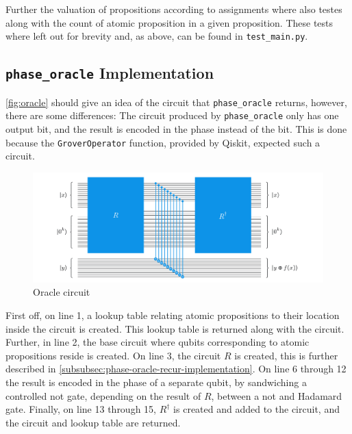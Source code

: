Further the valuation of propositions according to assignments where also testes along with the count of atomic proposition in a given proposition.
These tests where left out for brevity and, as above, can be found in \texttt{test\_main.py}.

\subsection{\texttt{phase\_oracle} Implementation}\label{subsec:phase-oracle}

\autoref{fig:oracle} should give an idea of the circuit that \texttt{phase\_oracle} returns, however, there are some differences: The circuit produced by \texttt{phase\_oracle} only has one output bit, and the result is encoded in the phase instead of the bit.
This is done because the \texttt{GroverOperator} function, provided by Qiskit, expected such a circuit.

\begin{figure}[H]
    \centering
    \includegraphics[width=\textwidth]{figures/garbage-free-computation.jpg}
    \caption{Oracle circuit}
    \label{fig:oracle}
\end{figure}

First off, on line 1, a lookup table relating atomic propositions to their location inside the circuit is created.
This lookup table is returned along with the circuit.
Further, in line 2, the base circuit where qubits corresponding to atomic propositions reside is created.
On line 3, the circuit $R$ is created, this is further described in \autoref{subsubsec:phase-oracle-recur-implementation}.
On line 6 through 12 the result is encoded in the phase of a separate qubit, by sandwiching a controlled not gate, depending on the result of $R$, between a not and Hadamard gate.
Finally, on line 13 through 15, $R^\dagger$ is created and added to the circuit, and the circuit and lookup table are returned.

